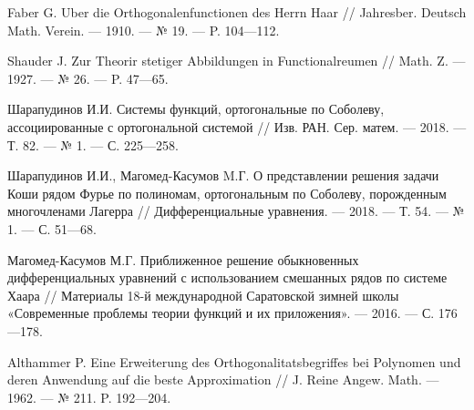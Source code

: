 \begin{thebibliography}{99}
	
Faber G. Uber die Orthogonalenfunctionen des Herrn Haar // Jahresber. Deutsch Math. Verein. --- 1910. --- № 19. --- P. 104---112.










Shauder J. Zur Theorir stetiger Abbildungen in Functionalreumen // Math. Z. --- 1927. --- № 26. --- P. 47---65.










Шарапудинов И.И. Системы функций, ортогональные по Соболеву, ассоциированные с ортогональной системой // Изв. РАН. Сер. матем. --- 2018. --- Т. 82. --- № 1. --- С. 225---258.










Шарапудинов И.И., Магомед-Касумов M.Г. О представлении решения задачи Коши  рядом Фурье  по полиномам, ортогональным по  Соболеву, порожденным многочленами Лагерра // Дифференциальные уравнения. --- 2018. --- Т. 54. --- № 1. --- С. 51---68.










Магомед-Касумов М.Г. Приближенное решение обыкновенных дифференциальных уравнений с использованием смешанных рядов по системе Хаара // Материалы 18-й международной Саратовской зимней школы «Современные проблемы теории функций и их приложения». --- 2016. --- С. 176---178.










Althammer P. Eine Erweiterung des Orthogonalitatsbegriffes bei Polynomen und deren Anwendung  auf die beste Approximation // J. Reine Angew. Math. --- 1962. --- № 211. P. 192---204.











\end{thebibliography}
